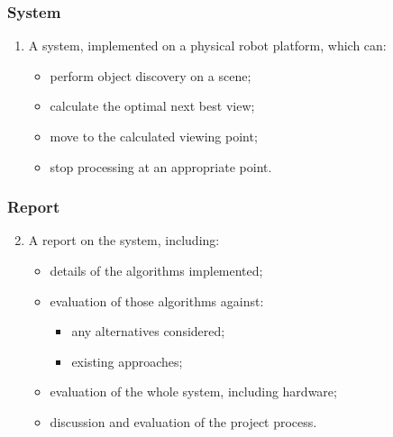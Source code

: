 
\begin{frame}[c]
	\frametitle{System}

	\bigskip

	\begin{enumerate}
		
		\item A system, implemented on a physical robot platform, which can:
		\medskip
		\begin{itemize}\itemsep8pt
			\item<+-> perform object discovery on a scene;
			\item<+-> calculate the optimal next best view;
			\item<+-> move to the calculated viewing point;
			\item<+-> stop processing at an appropriate point.
		\end{itemize}

	\end{enumerate}

\end{frame}


\begin{frame}[c]
	\frametitle{Report}

	\bigskip

	\begin{enumerate}
	\setcounter{enumi}{1}

		\item A report on the system, including:
		\medskip
		\begin{itemize}\itemsep8pt
			\item<1-> details of the algorithms implemented;
			\item<2-> evaluation of those algorithms against:
			\begin{itemize}
				\item<2-> any alternatives considered;
				\item<2-> existing approaches;
			\end{itemize}
			\item<3-> evaluation of the whole system, including hardware;
			\item<4-> discussion and evaluation of the project process.
		\end{itemize}

	\end{enumerate}

\end{frame}